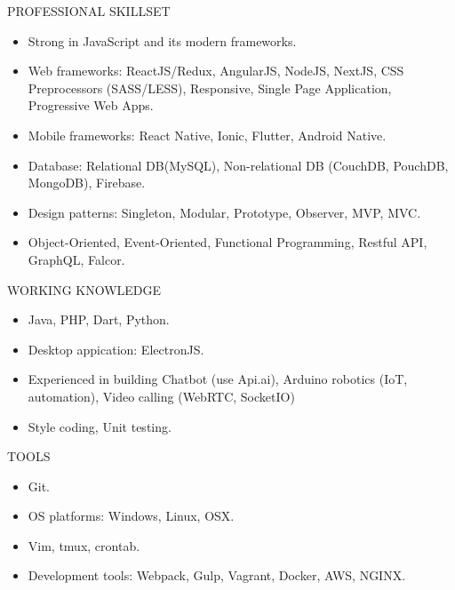 
  \hspace{5mm}\faTasks\hspace{1mm} {\fontsize{9pt}{1em}\bodyfont\scshape\color{awesome} PROFESSIONAL SKILLSET}
  \begin{itemize}
    \item {Strong in JavaScript and its modern frameworks.}
    \item {Web frameworks: ReactJS/Redux, AngularJS, NodeJS, NextJS, CSS Preprocessors (SASS/LESS), Responsive, Single Page Application, Progressive Web Apps.}
    \item {Mobile frameworks: React Native, Ionic, Flutter, Android Native.}
    \item {Database: Relational DB(MySQL), Non-relational DB (CouchDB, PouchDB, MongoDB), Firebase.}
    \item {Design patterns: Singleton, Modular, Prototype, Observer, MVP, MVC.}
    \item {Object-Oriented, Event-Oriented, Functional Programming, Restful API, GraphQL, Falcor.}
  \end{itemize}
  \hspace{5mm}\faTasks\hspace{1mm} {\fontsize{9pt}{1em}\bodyfont\scshape\color{awesome} WORKING KNOWLEDGE}
  \begin{itemize}
    \item {Java, PHP, Dart, Python.}
    \item {Desktop appication: ElectronJS.}
    \item {Experienced in building Chatbot (use Api.ai), Arduino robotics (IoT, automation), Video calling (WebRTC, SocketIO)}
    \item {Style coding, Unit testing.}
  \end{itemize}
  \hspace{5mm}\faTasks\hspace{1mm} {\fontsize{9pt}{1em}\bodyfont\scshape\color{awesome} TOOLS}
  \begin{itemize}
    \item {Git.}
    \item {OS platforms: Windows, Linux, OSX.}
    \item {Vim, tmux, crontab.}
    \item {Development tools: Webpack, Gulp, Vagrant, Docker, AWS, NGINX.}
  \end{itemize}
